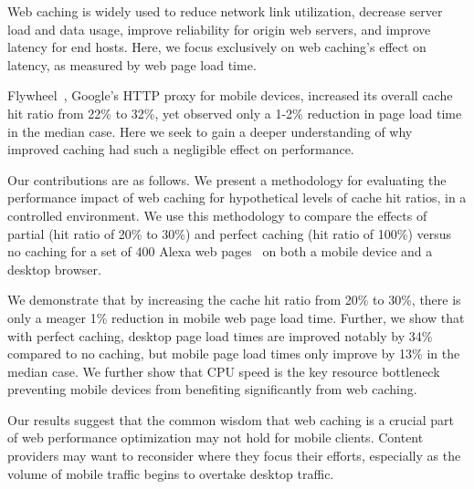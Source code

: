 \label{intro}
Web caching is widely used to reduce network link utilization, decrease server load and data usage, improve reliability for origin web servers, and improve latency for end hosts. 
Here, we focus exclusively on web caching's effect on latency, as measured by web page load time.

Flywheel~\cite{flywheel}, Google's HTTP proxy for mobile devices, increased
its overall cache hit ratio from 22\% to 32\%, yet observed only a 1-2\% reduction in page load time in the median case.
Here we seek to gain a deeper understanding of why improved caching had such a negligible effect on performance.

Our contributions are as follows.
We present a methodology
for evaluating the performance impact of web caching for hypothetical levels of cache hit ratios, in a controlled environment. We use this methodology to compare the effects of partial (hit ratio of 20\% to 30\%) and 
perfect caching (hit ratio of 100\%) versus no caching for a set of 400 Alexa web pages~\cite{alexa} on both a mobile device and a desktop browser.

We demonstrate that by increasing the cache hit ratio from 20\% to 30\%, there is only a meager 1\% reduction in mobile web page load time.
Further, we show that with perfect caching, desktop page load times are improved notably by 34\% compared to no caching, but mobile page load times only improve by 13\% in the median case.
We further show that CPU speed is the key resource bottleneck preventing mobile devices from benefiting significantly from web caching.

Our results suggest that the common wisdom that web caching is a crucial part of web performance optimization may not hold for mobile clients. Content providers may want to reconsider where they focus their efforts, especially as the volume of mobile traffic begins to overtake desktop traffic.
